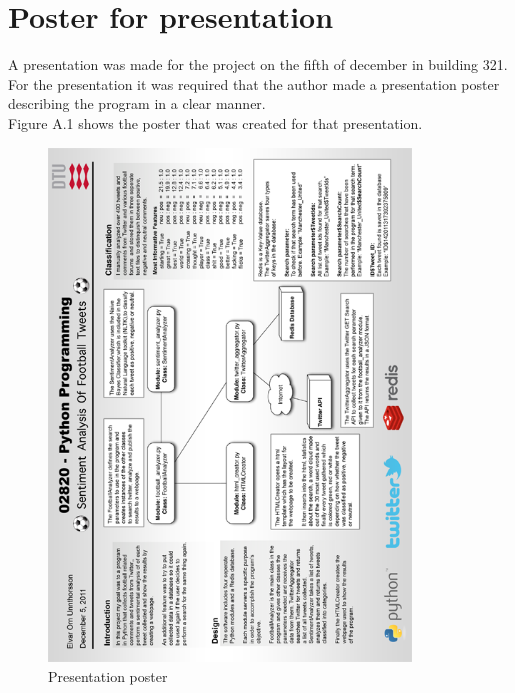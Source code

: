 \chapter{ Poster for presentation }
\label{chap:appendix1}

A presentation was made for the project on the fifth of december in building 321. For the presentation it was required that the author made a presentation poster describing the program in a clear manner.\\

Figure A.1 shows the poster that was created for that presentation. \\

\begin{figure}[h]
	\centering
		\includegraphics[height=515px]{images/Poster.png}
	\caption{ Presentation poster }
	\label{fig:images_Poster}
\end{figure}

\newpage